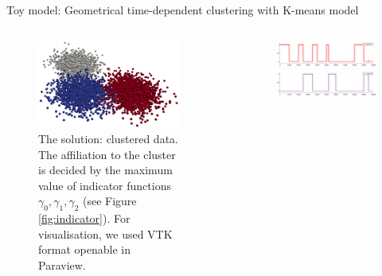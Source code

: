 \documentclass[final,hyperref={pdfpagelabels=false}]{beamer}
\begin{document}
\begin{frame}[t]
\begin{columns}[t]
\begin{column}{.48\textwidth}
\begin{block}{Toy model: Geometrical time-dependent clustering with K-means model}
\begin{columns}[T]
\begin{column}{0.46\linewidth}
	\begin{figure}[H]
		\begin{center}
			\includegraphics[width=1.0\linewidth, angle=0, clip = true]{figures/solution.png}
			\caption{The solution: clustered data. The affiliation to the cluster is decided by the maximum value of indicator functions $\gamma_0, \gamma_1, \gamma_2$ (see Figure \ref{fig:indicator}). For visualisation, we used VTK format openable in Paraview.
					 }
			\label{fig:kmeans_pizdaint3}	
		\end{center}
	\end{figure}
\end{column}	
\begin{column}{0.02\linewidth}\end{column}
\begin{column}{0.46\linewidth}
	\begin{figure}[H]
		\begin{center}
			\includegraphics[width=1.0\linewidth, angle=0, clip = true]{figures/gamma0.png} \\
			\includegraphics[width=1.0\linewidth, angle=0, clip = true]{figures/gamma1.png} \\

\end{center}
\end{figure}
\end{column}
\end{columns}
\end{block}
\end{column}
\end{columns}
\end{frame}
\end{document}
